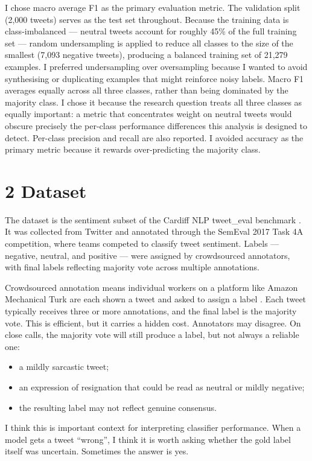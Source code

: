 \documentclass[12pt]{article}
\begin{document}
I chose macro average F1 as the primary evaluation metric. The validation split (2,000 tweets) serves as the test set throughout. Because the training data is class-imbalanced --- neutral tweets account for roughly 45\% of the full training set --- random undersampling is applied to reduce all classes to the size of the smallest (7,093 negative tweets), producing a balanced training set of 21,279 examples. I preferred undersampling over oversampling because I wanted to avoid synthesising or duplicating examples that might reinforce noisy labels. Macro F1 averages equally across all three classes, rather than being dominated by the majority class. I chose it because the research question treats all three classes as equally important: a metric that concentrates weight on neutral tweets would obscure precisely the per-class performance differences this analysis is designed to detect. Per-class precision and recall are also reported. I avoided accuracy as the primary metric because it rewards over-predicting the majority class.

\section*{2 Dataset}

The dataset is the sentiment subset of the Cardiff NLP tweet\_eval benchmark \citep{barbieri2020tweeteval}. It was collected from Twitter and annotated through the SemEval 2017 Task 4A competition, where teams competed to classify tweet sentiment. Labels --- negative, neutral, and positive --- were assigned by crowdsourced annotators, with final labels reflecting majority vote across multiple annotations.

Crowdsourced annotation means individual workers on a platform like Amazon Mechanical Turk are each shown a tweet and asked to assign a label \citep{rosenthal2017semeval}. Each tweet typically receives three or more annotations, and the final label is the majority vote. This is efficient, but it carries a hidden cost. Annotators may disagree. On close calls, the majority vote will still produce a label, but not always a reliable one:
\begin{itemize}
  \item a mildly sarcastic tweet;
  \item an expression of resignation that could be read as neutral or mildly negative;
  \item the resulting label may not reflect genuine consensus.
\end{itemize} I think this is important context for interpreting classifier performance. When a model gets a tweet ``wrong'', I think it is worth asking whether the gold label itself was uncertain. Sometimes the answer is yes.
\end{document}
